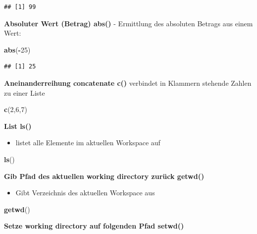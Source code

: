 \documentclass[]{book}
\newenvironment{Shaded}{\begin{snugshade}}{\end{snugshade}}
\newcommand{\KeywordTok}[1]{\textcolor[rgb]{0.13,0.29,0.53}{\textbf{#1}}}
\newcommand{\DecValTok}[1]{\textcolor[rgb]{0.00,0.00,0.81}{#1}}
\newcommand{\OperatorTok}[1]{\textcolor[rgb]{0.81,0.36,0.00}{\textbf{#1}}}
\newcommand{\NormalTok}[1]{#1}
\providecommand{\tightlist}{%
  \setlength{\itemsep}{0pt}\setlength{\parskip}{0pt}}
\begin{document}
\begin{verbatim}
## [1] 99
\end{verbatim}

\textbf{Absoluter Wert (Betrag) abs()} - Ermittlung des absoluten
Betrags aus einem Wert:

\begin{Shaded}
\begin{Highlighting}[]
\KeywordTok{abs}\NormalTok{(}\OperatorTok{-}\DecValTok{25}\NormalTok{)}
\end{Highlighting}
\end{Shaded}

\begin{verbatim}
## [1] 25
\end{verbatim}

\textbf{Aneinanderreihung concatenate c()} verbindet in Klammern
stehende Zahlen zu einer Liste

\begin{Shaded}
\begin{Highlighting}[]
\KeywordTok{c}\NormalTok{(}\DecValTok{2}\NormalTok{,}\DecValTok{6}\NormalTok{,}\DecValTok{7}\NormalTok{)}
\end{Highlighting}
\end{Shaded}

\textbf{List ls()}

\begin{itemize}
\tightlist
\item
  listet alle Elemente im aktuellen Workspace auf
\end{itemize}

\begin{Shaded}
\begin{Highlighting}[]
\KeywordTok{ls}\NormalTok{()}
\end{Highlighting}
\end{Shaded}

\textbf{Gib Pfad des aktuellen working directory zurück getwd()}

\begin{itemize}
\tightlist
\item
  Gibt Verzeichnis des aktuellen Workspace aus
\end{itemize}

\begin{Shaded}
\begin{Highlighting}[]
\KeywordTok{getwd}\NormalTok{()}
\end{Highlighting}
\end{Shaded}

\textbf{Setze working directory auf folgenden Pfad setwd()}
\end{document}

